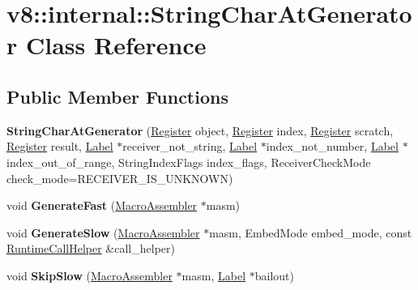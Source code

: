 \hypertarget{classv8_1_1internal_1_1_string_char_at_generator}{}\section{v8\+:\+:internal\+:\+:String\+Char\+At\+Generator Class Reference}
\label{classv8_1_1internal_1_1_string_char_at_generator}
\subsection*{Public Member Functions}
\begin{DoxyCompactItemize}
\item 
{\bfseries String\+Char\+At\+Generator} (\hyperlink{structv8_1_1internal_1_1_register}{Register} object, \hyperlink{structv8_1_1internal_1_1_register}{Register} index, \hyperlink{structv8_1_1internal_1_1_register}{Register} scratch, \hyperlink{structv8_1_1internal_1_1_register}{Register} result, \hyperlink{classv8_1_1internal_1_1_label}{Label} $\ast$receiver\+\_\+not\+\_\+string, \hyperlink{classv8_1_1internal_1_1_label}{Label} $\ast$index\+\_\+not\+\_\+number, \hyperlink{classv8_1_1internal_1_1_label}{Label} $\ast$index\+\_\+out\+\_\+of\+\_\+range, String\+Index\+Flags index\+\_\+flags, Receiver\+Check\+Mode check\+\_\+mode=R\+E\+C\+E\+I\+V\+E\+R\+\_\+\+I\+S\+\_\+\+U\+N\+K\+N\+O\+WN)\hypertarget{classv8_1_1internal_1_1_string_char_at_generator_aabb1b3950830cd6849df64d480fc7e03}{}\label{classv8_1_1internal_1_1_string_char_at_generator_aabb1b3950830cd6849df64d480fc7e03}

\item 
void {\bfseries Generate\+Fast} (\hyperlink{classv8_1_1internal_1_1_macro_assembler}{Macro\+Assembler} $\ast$masm)\hypertarget{classv8_1_1internal_1_1_string_char_at_generator_a7f14cda723c20af4ad0a5c8b9f25701a}{}\label{classv8_1_1internal_1_1_string_char_at_generator_a7f14cda723c20af4ad0a5c8b9f25701a}

\item 
void {\bfseries Generate\+Slow} (\hyperlink{classv8_1_1internal_1_1_macro_assembler}{Macro\+Assembler} $\ast$masm, Embed\+Mode embed\+\_\+mode, const \hyperlink{classv8_1_1internal_1_1_runtime_call_helper}{Runtime\+Call\+Helper} \&call\+\_\+helper)\hypertarget{classv8_1_1internal_1_1_string_char_at_generator_a5b7e3a9e7c94acc29f8d588188e9373a}{}\label{classv8_1_1internal_1_1_string_char_at_generator_a5b7e3a9e7c94acc29f8d588188e9373a}

\item 
void {\bfseries Skip\+Slow} (\hyperlink{classv8_1_1internal_1_1_macro_assembler}{Macro\+Assembler} $\ast$masm, \hyperlink{classv8_1_1internal_1_1_label}{Label} $\ast$bailout)\hypertarget{classv8_1_1internal_1_1_string_char_at_generator_a1db77ea0c9200d4f3b3301146aee74b2}{}\label{classv8_1_1internal_1_1_string_char_at_generator_a1db77ea0c9200d4f3b3301146aee74b2}

\end{DoxyCompactItemize}
